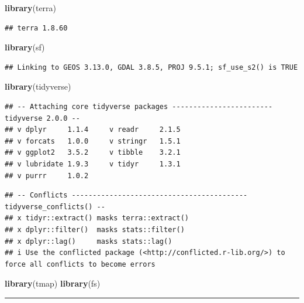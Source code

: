 \documentclass[
]{article}
\newenvironment{Shaded}{\begin{snugshade}}{\end{snugshade}}
\newcommand{\FunctionTok}[1]{\textcolor[rgb]{0.13,0.29,0.53}{\textbf{#1}}}
\newcommand{\NormalTok}[1]{#1}
\begin{document}
\begin{Shaded}
\begin{Highlighting}[]
\FunctionTok{library}\NormalTok{(terra)}
\end{Highlighting}
\end{Shaded}

\begin{verbatim}
## terra 1.8.60
\end{verbatim}

\begin{Shaded}
\begin{Highlighting}[]
\FunctionTok{library}\NormalTok{(sf)}
\end{Highlighting}
\end{Shaded}

\begin{verbatim}
## Linking to GEOS 3.13.0, GDAL 3.8.5, PROJ 9.5.1; sf_use_s2() is TRUE
\end{verbatim}

\begin{Shaded}
\begin{Highlighting}[]
\FunctionTok{library}\NormalTok{(tidyverse)}
\end{Highlighting}
\end{Shaded}

\begin{verbatim}
## -- Attaching core tidyverse packages ------------------------ tidyverse 2.0.0 --
## v dplyr     1.1.4     v readr     2.1.5
## v forcats   1.0.0     v stringr   1.5.1
## v ggplot2   3.5.2     v tibble    3.2.1
## v lubridate 1.9.3     v tidyr     1.3.1
## v purrr     1.0.2
\end{verbatim}

\begin{verbatim}
## -- Conflicts ------------------------------------------ tidyverse_conflicts() --
## x tidyr::extract() masks terra::extract()
## x dplyr::filter()  masks stats::filter()
## x dplyr::lag()     masks stats::lag()
## i Use the conflicted package (<http://conflicted.r-lib.org/>) to force all conflicts to become errors
\end{verbatim}

\begin{Shaded}
\begin{Highlighting}[]
\FunctionTok{library}\NormalTok{(tmap)}
\FunctionTok{library}\NormalTok{(fs)}
\end{Highlighting}
\end{Shaded}

\begin{center}\rule{0.5\linewidth}{0.5pt}\end{center}
\end{document}
